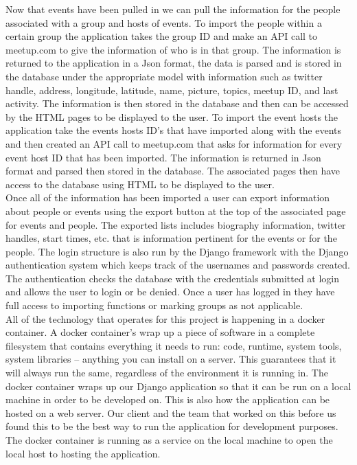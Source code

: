 \documentclass[draftclsnofoot,10pt,onecolumn]{IEEEtran} %
\begin{document}
Now that events have been pulled in we can pull the information for the people associated with a group and hosts of events. To import the people within a certain group the application takes the group ID and make an API call to meetup.com to give the information of who is in that group. The information is returned to the application in a Json format, the data is parsed and is stored in the database under the appropriate model with information such as twitter handle, address, longitude, latitude, name, picture, topics, meetup ID, and last activity. The information is then stored in the database and then can be accessed by the HTML pages to be displayed to the user. To import the event hosts the application take the events hosts ID's that have imported along with the events and then created an API call to meetup.com that asks for information for every event host ID that has been imported. The information is returned in Json format and parsed then stored in the database. The associated pages then have access to the database using HTML to be displayed to the user. \\

Once all of the information has been imported a user can export information about people or events using the export button at the top of the associated page for events and people. The exported lists includes biography information, twitter handles, start times, etc. that is information pertinent for the events or for the people. The login structure is also run by the Django framework with the Django authentication system which keeps track of the usernames and passwords created. The authentication checks the database with the credentials submitted at login and allows the user to login or be denied. Once a user has logged in they have full access to importing functions or marking groups as not applicable. \\

All of the technology that operates for this project is happening in a docker container. A docker container's wrap up a piece of software in a complete filesystem that contains everything it needs to run: code, runtime, system tools, system libraries – anything you can install on a server. This guarantees that it will always run the same, regardless of the environment it is running in. The docker container wraps up our Django application so that it can be run on a local machine in order to be developed on. This is also how the application can be hosted on a web server. Our client and the team that worked on this before us found this to be the best way to run the application for development purposes. The docker container is running as a service on the local machine to open the local host to hosting the application.
\end{document}
